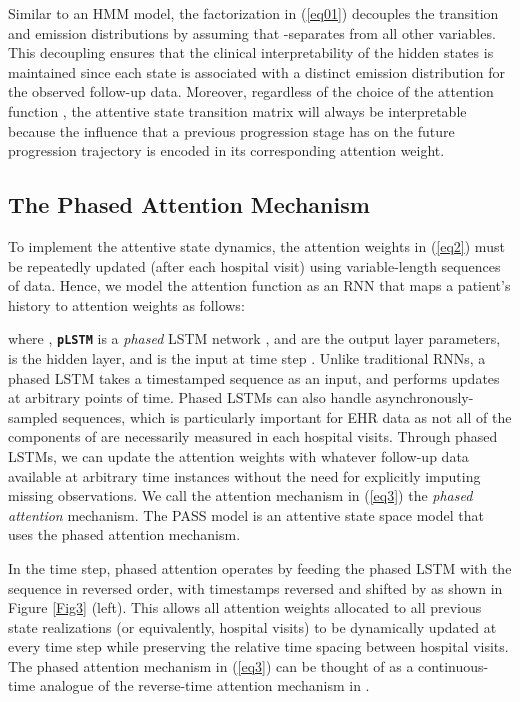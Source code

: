 \documentclass[twoside,11pt]{article}
\begin{document}
Similar to an HMM model, the factorization in (\ref{eq01}) decouples the transition and emission distributions by assuming that \mbox{\footnotesize } -separates \mbox{\footnotesize } from all other variables. This decoupling ensures that the clinical interpretability of the hidden states is maintained since each state is associated with a distinct emission distribution for the observed follow-up data. Moreover, regardless of the choice of the attention function \mbox{\footnotesize }, the attentive state transition matrix \mbox{\footnotesize } will always be interpretable because the influence that a previous progression stage has on the future progression trajectory is encoded in its corresponding attention weight. 

\subsection{The Phased Attention Mechanism}
\label{Sec33}
To implement the attentive state dynamics, the attention weights in (\ref{eq2}) must be repeatedly updated (after each hospital visit) using variable-length sequences of data. Hence, we model the attention function \mbox{\footnotesize } as an RNN that maps a patient's history to attention weights as follows:   
 
where \mbox{\footnotesize }, \textbf{\texttt{pLSTM}} is a {\it phased} LSTM network \cite{neil2016phased}, \mbox{\footnotesize } and \mbox{\footnotesize } are the output layer parameters, \mbox{\footnotesize } is the hidden layer, and \mbox{\footnotesize } is the input at time step \mbox{\footnotesize }. Unlike traditional RNNs, a phased LSTM takes a timestamped sequence as an input, and performs updates at arbitrary points of time. Phased LSTMs can also handle asynchronously-sampled sequences, which is particularly important for EHR data as not all of the components of \mbox{\footnotesize } are necessarily measured in each hospital visits. Through phased LSTMs, we can update the attention weights with whatever follow-up data available at arbitrary time instances without the need for explicitly imputing missing observations. We call the attention mechanism in (\ref{eq3}) the {\it phased attention} mechanism. The PASS model is an attentive state space model that uses the phased attention mechanism. 

In the \mbox{\footnotesize } time step, phased attention operates by feeding the phased LSTM with the sequence \mbox{\footnotesize } in reversed order, with timestamps reversed and shifted by \mbox{\footnotesize } as shown in Figure \ref{Fig3} (left). This allows all attention weights allocated to all previous state realizations (or equivalently, hospital visits) to be dynamically updated at every time step while preserving the relative time spacing between hospital visits. The phased attention mechanism in (\ref{eq3}) can be thought of as a continuous-time analogue of the reverse-time attention mechanism in \cite{choi2016retain}. 
\end{document}
